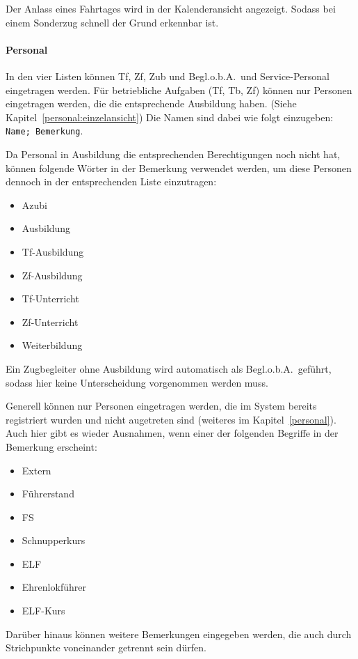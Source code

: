 Der Anlass eines Fahrtages wird in der Kalenderansicht angezeigt.
Sodass bei einem Sonderzug schnell der Grund erkennbar ist.

\paragraph{Personal}
In den vier Listen können Tf, Zf, Zub und Begl.o.b.A.\ und Service-Personal eingetragen werden.
Für betriebliche Aufgaben (Tf, Tb, Zf) können nur Personen eingetragen werden, die die entsprechende Ausbildung haben.
(Siehe Kapitel~\ref{personal:einzelansicht})
Die Namen sind dabei wie folgt einzugeben: \texttt{Name; Bemerkung}.

Da Personal in Ausbildung die entsprechenden Berechtigungen noch nicht hat, können folgende Wörter in der Bemerkung verwendet werden, um diese Personen dennoch in der entsprechenden Liste einzutragen:
\begin{itemize}
	\item Azubi
	\item Ausbildung
	\item Tf-Ausbildung
	\item Zf-Ausbildung
	\item Tf-Unterricht
	\item Zf-Unterricht
	\item Weiterbildung
\end{itemize}
Ein Zugbegleiter ohne Ausbildung wird automatisch als Begl.o.b.A.\ geführt, sodass hier keine Unterscheidung vorgenommen werden muss.

Generell können nur Personen eingetragen werden, die im System bereits registriert wurden und nicht augetreten sind
(weiteres im Kapitel~\ref{personal}).
Auch hier gibt es wieder Ausnahmen, wenn einer der folgenden Begriffe in der Bemerkung erscheint:
\begin{itemize}
	\item Extern
	\item Führerstand
	\item FS
	\item Schnupperkurs
	\item ELF
	\item Ehrenlokführer
	\item ELF-Kurs
\end{itemize}
Darüber hinaus können weitere Bemerkungen eingegeben werden, die auch durch Strichpunkte voneinander getrennt sein dürfen.




